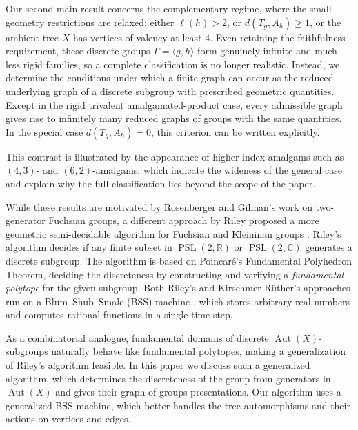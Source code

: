 \documentclass[12pt,leqno]{amsart}
\newcommand{\2}{L^2_{\rm per}(0, T)}
\newcommand{\aut}{{\operatorname{Aut}}}
\newcommand{\psl}{{\operatorname{PSL}}}
\numberwithin{equation}{section}
\numberwithin{figure}{section}
\begin{document}

Our second main result concerns the complementary regime, where the small-geometry restrictions are relaxed: either $\ell(h)>2$, or $d(T_g,A_h)\geq 1$, or the ambient tree $X$ has vertices of valency at least $4$. Even retaining the faithfulness requirement, these discrete groups $\Gamma=\langle g,h\rangle$ form genuinely infinite and much less rigid families, so a complete classification is no longer realistic. Instead, we determine the conditions under which a finite graph can occur as the reduced underlying graph of a discrete subgroup with prescribed geometric quantities. Except in the rigid trivalent amalgamated-product case, every admissible graph gives rise to infinitely many reduced graphs of groups with the same quantities. In the special case $d(T_g,A_h)=0$, this criterion can be written explicitly.

This contrast is illustrated by the appearance of higher-index amalgams such as $(4,3)$- and $(6,2)$-amalgams, which indicate the wideness of the general case and explain why the full classification lies beyond the scope of the paper.

While these results are motivated by Rosenberger and Gilman's work on two-generator Fuchsian groups, a different approach by Riley proposed a more geometric semi-decidable algorithm for Fuchsian and Kleininan groups \cite{riley1983applications}. Riley's algorithm decides if any finite subset in $\psl(2,\mathbb{R})$ or $\psl(2,\mathbb{C})$ generates a discrete subgroup. The algorithm is based on Poincar\'e’s Fundamental Polyhedron Theorem, deciding the discreteness by constructing and verifying a \emph{fundamental polytope} for the given subgroup. Both Riley's and Kirschmer-R\"uther's approaches run on a Blum–Shub–Smale (BSS) machine \cite{blum1989theory}, which stores arbitrary real numbers and computes rational functions in a single time step.

As a combinatorial analogue, fundamental domains of discrete $\aut(X)$-subgroups naturally behave like fundamental polytopes, making a generalization of Riley's algorithm feasible. In this paper we discuss such a generalized algorithm, which determines the discreteness of the group from generators in $\aut(X)$ and gives their graph-of-groups presentations. Our algorithm uses a generalized BSS machine, which better handles the tree automorphisms and their actions on vertices and edges.
\end{document}
